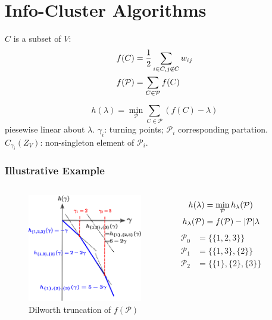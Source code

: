 \documentclass{beamer}
\DeclarePairedDelimiter\abs{\lvert}{\rvert}
\def\P{\mathcal{P}}
\begin{document}
\section{Info-Cluster Algorithms}
\begin{frame}
\begin{definition}
$C$ is a subset of $V$:
\begin{align}
f(C) & ={1 \over 2} \sum_{i\in C, j \not\in C} w_{ij} \\
f(\P) & = \sum_{C \in \P} f(C)
\end{align}
\end{definition}
\begin{theorem}
\begin{equation}\label{eq:hLambda}
h(\lambda) = \min_{\P} \sum_{C\in \P} (f(C)-\lambda)
\end{equation} piesewise linear about $\lambda$. 
$\gamma_i$: turning points; $\P_i$ corresponding partation. $C_{\gamma_i}(Z_V)$: non-singleton element of $\P_i$.
\end{theorem}
\end{frame}
\begin{frame}
\frametitle{Illustrative Example}
\begin{columns}
\column{5cm}
\begin{figure}
\includegraphics[width=5cm]{pic/dt.eps}
\caption{Dilworth truncation of $f(\P)$}
\end{figure}
\column{5cm}
\begin{align*}
h(\lambda)  & = \min_{\P} h_{\lambda}(\P) \\
h_{\lambda}(\P) & = f(\P) - \abs{\P}\lambda
\end{align*}
\begin{align*}
\P_0  & = \{\{1,2,3\}\} \\
\P_1  & = \{\{1,3\},\{2\}\} \\
\P_2  & = \{\{1\},\{2\},\{3\}\} 
\end{align*}

\end{columns}
\end{frame}
\end{document}

